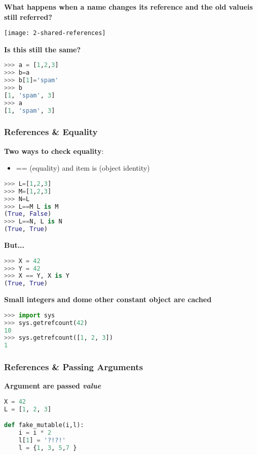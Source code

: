 \textbf{What happens when a name changes its reference and the old valueis still referred?}

\begin{center}
\texttt{[image: 2-shared-references]}
\end{center}

\textbf{Is this still the same?}

\begin{lstlisting}[language=Python]
>>> a = [1,2,3]  
>>> b=a
>>> b[1]='spam'
>>> b
[1, 'spam', 3]
>>> a
[1, 'spam', 3]
\end{lstlisting}

\subsubsection{References \& Equality}

\textbf{Two ways to check equality}:

\begin{itemize}
	\item == (equality) and
	item is (object identity)
\end{itemize}

\begin{lstlisting}[language=Python]
>>> L=[1,2,3]
>>> M=[1,2,3]
>>> N=L
>>> L==M L is M
(True, False)
>>> L==N, L is N
(True, True)
\end{lstlisting}

\textbf{But...}

\begin{lstlisting}[language=Python]
>>> X = 42
>>> Y = 42
>>> X == Y, X is Y
(True, True)
\end{lstlisting}


\textbf{Small integers and dome other constant object are cached}

\begin{lstlisting}[language=Python]
>>> import sys
>>> sys.getrefcount(42)
10
>>> sys.getrefcount([1, 2, 3])
1
\end{lstlisting}

\subsubsection{References \& Passing Arguments}

\textbf{Argument are passed \textit{value}}

\begin{lstlisting}[language=Python]
X = 42
L = [1, 2, 3]

def fake_mutable(i,l):
	i = i * 2
	l[1] = '?!?!'
	l = {1, 3, 5,7 }
\end{lstlisting}


